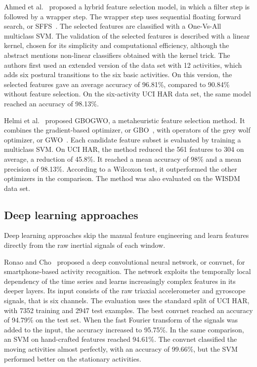 \documentclass[a4paper, 11pt]{article}
\begin{document}
Ahmed et al.~\cite{ahmed2020} proposed a hybrid feature selection model, in which a filter step is followed by a wrapper step. The wrapper step uses sequential floating forward search, or SFFS~\cite{pudil1994}. The selected features are classified with a One-Vs-All multiclass SVM. The validation of the selected features is described with a linear kernel, chosen for its simplicity and computational efficiency, although the abstract mentions non-linear classifiers obtained with the kernel trick. The authors first used an extended version of the data set with 12 activities, which adds six postural transitions to the six basic activities. On this version, the selected features gave an average accuracy of 96.81\%, compared to 90.84\% without feature selection. On the six-activity UCI HAR data set, the same model reached an accuracy of 98.13\%.

Helmi et al.~\cite{helmi2021} proposed GBOGWO, a metaheuristic feature selection method. It combines the gradient-based optimizer, or GBO~\cite{ahmadianfar2020}, with operators of the grey wolf optimizer, or GWO~\cite{mirjalili2014}. Each candidate feature subset is evaluated by training a multiclass SVM. On UCI HAR, the method reduced the 561 features to 304 on average, a reduction of 45.8\%. It reached a mean accuracy of 98\% and a mean precision of 98.13\%. According to a Wilcoxon test, it outperformed the other optimizers in the comparison. The method was also evaluated on the WISDM data set.

\subsection{Deep learning approaches}

Deep learning approaches skip the manual feature engineering and learn features directly from the raw inertial signals of each window.

Ronao and Cho~\cite{ronao2016} proposed a deep convolutional neural network, or convnet, for smartphone-based activity recognition. The network exploits the temporally local dependency of the time series and learns increasingly complex features in its deeper layers. Its input consists of the raw triaxial accelerometer and gyroscope signals, that is six channels. The evaluation uses the standard split of UCI HAR, with 7352 training and 2947 test examples. The best convnet reached an accuracy of 94.79\% on the test set. When the fast Fourier transform of the signals was added to the input, the accuracy increased to 95.75\%. In the same comparison, an SVM on hand-crafted features reached 94.61\%. The convnet classified the moving activities almost perfectly, with an accuracy of 99.66\%, but the SVM performed better on the stationary activities.
\end{document}
